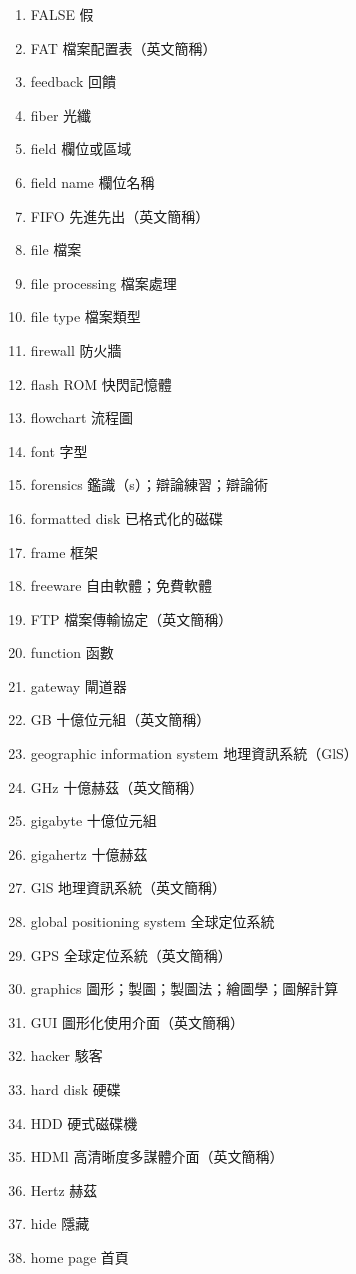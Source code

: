 \begin{enumerate}
  \item FALSE 假
  \item FAT 檔案配置表（英文簡稱）
  \item feedback 回饋
  \item fiber 光纖
  \item field 欄位或區域
  \item field name 欄位名稱
  \item FIFO 先進先出（英文簡稱）
  \item file 檔案
  \item file processing 檔案處理
  \item file type 檔案類型
  \item firewall 防火牆
  \item flash ROM 快閃記憶體
  \item flowchart 流程圖
  \item font 字型
  \item forensics 鑑識（s）；辯論練習；辯論術
  \item formatted disk 已格式化的磁碟
  \item frame 框架
  \item freeware 自由軟體；免費軟體
  \item FTP 檔案傳輸協定（英文簡稱）
  \item function 函數
  \item gateway 閘道器
  \item GB 十億位元組（英文簡稱）
  \item geographic information system 地理資訊系統（GlS）
  \item GHz 十億赫茲（英文簡稱）
  \item gigabyte 十億位元組
  \item gigahertz 十億赫茲
  \item GlS 地理資訊系統（英文簡稱）
  \item global positioning system 全球定位系統
  \item GPS 全球定位系統（英文簡稱）
  \item graphics 圖形；製圖；製圖法；繪圖學；圖解計算
  \item GUI 圖形化使用介面（英文簡稱）
  \item hacker 駭客
  \item hard disk 硬碟
  \item HDD 硬式磁碟機
  \item HDMl 高清晰度多謀體介面（英文簡稱）
  \item Hertz 赫茲
  \item hide 隱藏
  \item home page 首頁

\end{enumerate}
